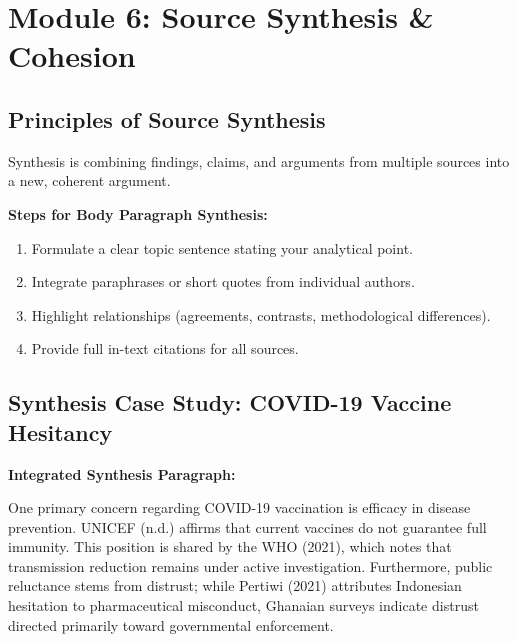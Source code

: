\documentclass[11pt, a4paper]{article}
\begin{document}
\section{Module 6: Source Synthesis \& Cohesion}

\subsection{Principles of Source Synthesis}
Synthesis is combining findings, claims, and arguments from multiple sources into a new, coherent argument.

\textbf{Steps for Body Paragraph Synthesis:}
\begin{enumerate}
    \item Formulate a clear topic sentence stating your analytical point.
    \item Integrate paraphrases or short quotes from individual authors.
    \item Highlight relationships (agreements, contrasts, methodological differences).
    \item Provide full in-text citations for all sources.
\end{enumerate}

\subsection{Synthesis Case Study: COVID-19 Vaccine Hesitancy}
\textbf{Integrated Synthesis Paragraph:}
\begin{mdframed}[style=summarybox]
    One primary concern regarding COVID-19 vaccination is efficacy in disease prevention. UNICEF (n.d.) affirms that current vaccines do not guarantee full immunity. This position is shared by the WHO (2021), which notes that transmission reduction remains under active investigation. Furthermore, public reluctance stems from distrust; while Pertiwi (2021) attributes Indonesian hesitation to pharmaceutical misconduct, Ghanaian surveys indicate distrust directed primarily toward governmental enforcement.
\end{mdframed}
\end{document}
